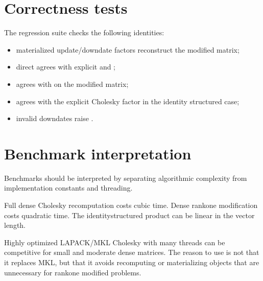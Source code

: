 \documentclass[a4paper,11pt,english]{sphinxmanual}
\begin{document}
\section{Correctness tests}
\label{\detokenize{manual:correctness-tests}}
\sphinxAtStartPar
The regression suite checks the following identities:
\begin{itemize}
\item {} 
\sphinxAtStartPar
materialized update/downdate factors reconstruct the modified matrix;

\item {} 
\sphinxAtStartPar
direct  agrees with explicit  and ;

\item {} 
\sphinxAtStartPar
{} agrees with  on the modified matrix;

\item {} 
\sphinxAtStartPar
{} agrees with the explicit Cholesky factor in the identity
structured case;

\item {} 
\sphinxAtStartPar
invalid downdates raise .

\end{itemize}


\section{Benchmark interpretation}
\label{\detokenize{manual:benchmark-interpretation}}
\sphinxAtStartPar
Benchmarks should be interpreted by separating algorithmic complexity from
implementation constants and threading.

\sphinxAtStartPar
Full dense Cholesky recomputation costs cubic time.  Dense rank\sphinxhyphen{}one
modification costs quadratic time.  The identity\sphinxhyphen{}structured product can be
linear in the vector length.

\sphinxAtStartPar
Highly optimized LAPACK/MKL Cholesky with many threads can be competitive for
small and moderate dense matrices.  The reason to use  is not that
it replaces MKL, but that it avoids recomputing or materializing objects that
are unnecessary for rank\sphinxhyphen{}one modified problems.

\sphinxstepscope
\end{document}
